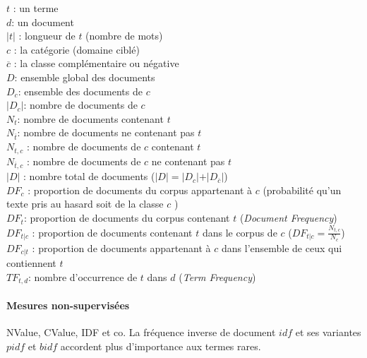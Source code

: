 
$t$ : un terme \\
$d$: un document \\
$\vert t \vert$ : longueur de $t$ (nombre de mots) \\
$c$ : la catégorie (domaine ciblé) \\
$\overline{c}$ : la classe complémentaire ou négative \\
$D$: ensemble global des documents \\
$D_{c}$: ensemble des documents de $c$\\
$\vert D_{c} \vert$: nombre de documents de $c$\\
$N_{t}$: nombre de documents contenant $t$\\
$N_{\overline{t}}$: nombre de documents ne contenant pas $t$\\
$N_{t,c}$ : nombre de documents de $c$ contenant $t$ \\
$N_{\overline{t},c}$ : nombre de documents de $c$ ne contenant pas $t$ \\
$\vert D \vert$ : nombre total de documents ($\vert D \vert = \vert D_{c} \vert + \vert D_{\overline{c}} \vert$)\\
$DF_c$ : proportion de documents du corpus appartenant à $c$ (probabilité qu'un texte pris au hasard soit de la classe $c$ )\\
$DF_t$: proportion de documents du corpus contenant $t$ (\textit{Document Frequency})\\
$DF_{t \vert c}$ : proportion de documents contenant $t$ dans le corpus de $c$ ($DF_{t \vert c} = \frac{N_{t,c}}{N_{c}}$) \\
$DF_{c \vert t}$ : proportion de documents appartenant à $c$ dans l'ensemble de ceux qui contiennent $t$  \\
$TF_{t, d}$: nombre d'occurrence de $t$ dans $d$ (\textit{Term Frequency}) \\

\paragraph{Mesures non-supervisées}
NValue, CValue, IDF et co.
 La fréquence inverse de document $idf$ \cite{sparck1972idf} et ses variantes $pidf$ et $bidf$ accordent plus d'importance aux termes rares.  

